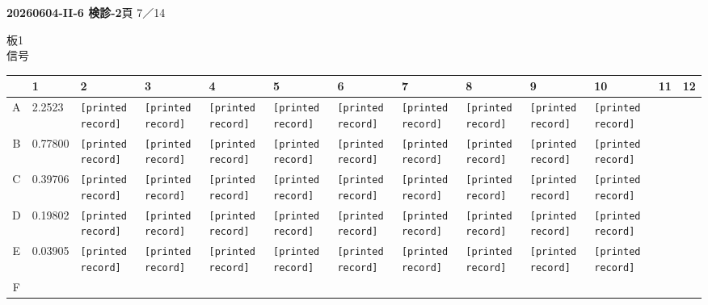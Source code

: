 \documentclass[UTF8,10pt,a4paper,fontset=fandol]{ctexart}
\newcommand{\fieldvalue}[1]{#1}
\begin{document}
\newpage

\noindent
\textbf{20260604-II-6 検診-2}\hfill 頁 7／14

\vspace{0.5em}

\noindent
板1\\
信号

\begin{center}
\scriptsize
\begin{tabular}{c|*{12}{p{0.55cm}|}}
 & 1 & 2 & 3 & 4 & 5 & 6 & 7 & 8 & 9 & 10 & 11 & 12\\ \hline
A &
\fieldvalue{2.2523} &
\texttt{[printed record]} &
\texttt{[printed record]} &
\texttt{[printed record]} &
\texttt{[printed record]} &
\texttt{[printed record]} &
\texttt{[printed record]} &
\texttt{[printed record]} &
\texttt{[printed record]} &
\texttt{[printed record]} & & \\ \hline
B &
\fieldvalue{0.77800} &
\texttt{[printed record]} &
\texttt{[printed record]} &
\texttt{[printed record]} &
\texttt{[printed record]} &
\texttt{[printed record]} &
\texttt{[printed record]} &
\texttt{[printed record]} &
\texttt{[printed record]} &
\texttt{[printed record]} & & \\ \hline
C &
\fieldvalue{0.39706} &
\texttt{[printed record]} &
\texttt{[printed record]} &
\texttt{[printed record]} &
\texttt{[printed record]} &
\texttt{[printed record]} &
\texttt{[printed record]} &
\texttt{[printed record]} &
\texttt{[printed record]} &
\texttt{[printed record]} & & \\ \hline
D &
\fieldvalue{0.19802} &
\texttt{[printed record]} &
\texttt{[printed record]} &
\texttt{[printed record]} &
\texttt{[printed record]} &
\texttt{[printed record]} &
\texttt{[printed record]} &
\texttt{[printed record]} &
\texttt{[printed record]} &
\texttt{[printed record]} & & \\ \hline
E &
\fieldvalue{0.03905} &
\texttt{[printed record]} &
\texttt{[printed record]} &
\texttt{[printed record]} &
\texttt{[printed record]} &
\texttt{[printed record]} &
\texttt{[printed record]} &
\texttt{[printed record]} &
\texttt{[printed record]} &
\texttt{[printed record]} & & \\ \hline
F &

\end{tabular}
\end{center}
\end{document}
